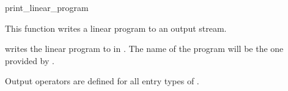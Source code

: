 \begin{ccRefFunction}{print_linear_program}


This function writes a linear program to an output stream.

{writes the linear program  to  in 
. The name of the program will be the one provided 
by .}

Output operators are defined for all entry types of .

\end{ccRefFunction}
